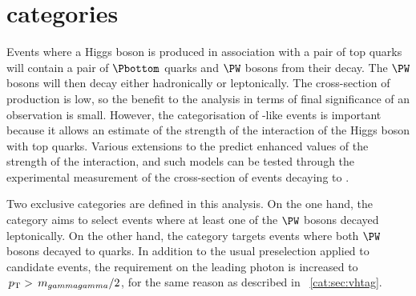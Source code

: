 \section{\TTHTag categories}
\label{cat:sec:tthtag}

Events where a Higgs boson is produced in association with a pair of top quarks will contain a pair of $\Pbottom$ quarks and $\PW$ bosons from their decay. The $\PW$ bosons will then decay either hadronically or leptonically. The cross-section of \ttH production is low, so the benefit to the analysis in terms of final significance of an observation is small. However, the categorisation of \ttH-like events is important because it allows an estimate of the strength of the interaction of the Higgs boson with top quarks. Various extensions to the \SM predict enhanced values of the strength of the \ttH interaction, and such models can be tested through the experimental measurement of the cross-section of \ttH events decaying to \Hgg.

Two exclusive \TTHTag categories are defined in this analysis. On the one hand, the \TTHLeptonicTag category aims to select \ttH events where at least one of the $\PW$ bosons decayed leptonically. On the other hand, the \TTHHadronicTag category targets events where both $\PW$ bosons decayed to quarks. In addition to the usual preselection applied to candidate events, the requirement on the leading photon \pT is increased to $\,p_\text{T}>\,m_{gammagamma}/2$, for the same reason as described in \Sec~\ref{cat:sec:vhtag}. %

